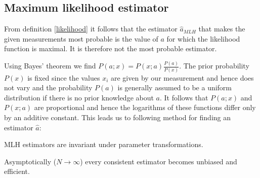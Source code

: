 {    

\subsection{Maximum likelihood estimator}

    From definition \ref{likelihood} it follows that the estimator $\hat{a}_{MLH}$ that makes the given measurements most probable is the value of $a$ for which the likelihood function is maximal. It is therefore not the most probable estimator.

    Using Bayes' theorem we find $P(a;x) = P(x;a)\frac{P(a)}{P(x)}$. The prior probability $P(x)$ is fixed since the values $x_i$ are given by our measurement and hence does not vary and the probability $P(a)$ is generally assumed to be a uniform distribution if there is no prior knowledge about $a$. It follows that $P(a;x)$ and $P(x;a)$ are proportional and hence the logarithms of these functions differ only by an additive constant. This leads us to following method for finding an estimator $\hat{a}$:

    \begin{property}
        MLH estimators are invariant under parameter transformations.
    \end{property}

    \begin{property}
        Asymptotically ($N\rightarrow\infty$) every consistent estimator becomes unbiased and efficient.
    \end{property}

}

